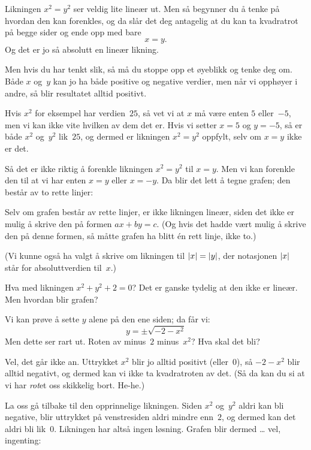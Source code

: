 \begin{losning}
\begin{punkt}
Likningen $x^2 = y^2$ ser veldig lite lineær ut.  Men så begynner du å
tenke på hvordan den kan forenkles, og da slår det deg antagelig at du
kan ta kvadratrot på begge sider og ende opp med bare
\[
x = y.
\]
Og det er jo så absolutt en lineær likning.

Men hvis du har tenkt slik, så må du stoppe opp et øyeblikk og tenke
deg om.  Både $x$ og~$y$ kan jo ha både positive og negative verdier,
men når vi opphøyer i andre, så blir resultatet alltid positivt.

Hvis $x^2$ for eksempel har verdien~$25$, så vet vi at $x$ må være
enten $5$ eller~$-5$, men vi kan ikke vite hvilken av dem det er.
Hvis vi setter $x = 5$ og $y = -5$, så er både $x^2$ og~$y^2$
lik~$25$, og dermed er likningen $x^2 = y^2$ oppfylt, selv om $x = y$
ikke er det.

Så det er ikke riktig å forenkle likningen $x^2 = y^2$ til $x = y$.
Men vi kan forenkle den til at vi har enten $x = y$ eller $x = -y$.
Da blir det lett å tegne grafen; den består av to rette linjer:
\begin{center}
\end{center}

Selv om grafen består av rette linjer, er ikke likningen lineær, siden
det ikke er mulig å skrive den på formen $ax + by = c$.  (Og hvis det
hadde vært mulig å skrive den på denne formen, så måtte grafen ha
blitt én rett linje, ikke to.)

(Vi kunne også ha valgt å skrive om likningen til $|x| = |y|$,
der notasjonen $|x|$ står for absoluttverdien til~$x$.)
\end{punkt}

\begin{punkt}
Hva med likningen $x^2 + y^2 + 2 = 0$?  Det er ganske tydelig at den
ikke er lineær.  Men hvordan blir grafen?

Vi kan prøve å sette $y$ alene på den ene siden; da får vi:
\[
y = \pm \sqrt{-2 - x^2}
\]
Men dette ser rart ut.  Roten av minus~$2$ minus~$x^2$?  Hva skal det
bli?

Vel, det går ikke an.  Uttrykket $x^2$ blir jo alltid positivt
(eller~$0$), så $-2-x^2$ blir alltid negativt, og dermed kan vi ikke
ta kvadratroten av det.  (Så da kan du si at vi har \emph{rot}et oss
skikkelig bort.  He-he.)

La oss gå tilbake til den opprinnelige likningen.  Siden $x^2$
og~$y^2$ aldri kan bli negative, blir uttrykket på venstresiden aldri
mindre enn~$2$, og dermed kan det aldri bli lik~$0$.  Likningen har
altså ingen løsning.  Grafen blir dermed \ldots{} vel, ingenting:
\begin{center}
\end{center}
\end{punkt}
\end{losning}


